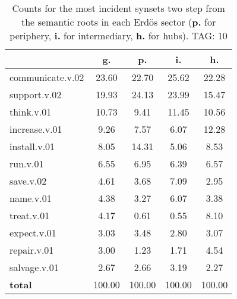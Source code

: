 \begin{table}[h!]
\begin{center}
\begin{tabular}{| l | c | c | c | c |}\hline
 & g. & p. & i. & h. \\\hline
communicate.v.02 & 23.60  & 22.70  & 25.62  & 22.28 \\\hline
support.v.02 & 19.93  & 24.13  & 23.99  & 15.47 \\\hline
think.v.01 & 10.73  & 9.41  & 11.45  & 10.56 \\\hline
increase.v.01 & 9.26  & 7.57  & 6.07  & 12.28 \\\hline
install.v.01 & 8.05  & 14.31  & 5.06  & 8.53 \\\hline
run.v.01 & 6.55  & 6.95  & 6.39  & 6.57 \\\hline
save.v.02 & 4.61  & 3.68  & 7.09  & 2.95 \\\hline
name.v.01 & 4.38  & 3.27  & 6.07  & 3.38 \\\hline
treat.v.01 & 4.17  & 0.61  & 0.55  & 8.10 \\\hline
expect.v.01 & 3.03  & 3.48  & 2.80  & 3.07 \\\hline
repair.v.01 & 3.00  & 1.23  & 1.71  & 4.54 \\\hline
salvage.v.01 & 2.67  & 2.66  & 3.19  & 2.27 \\\hline
{{\bf total}} & 100.00  & 100.00  & 100.00  & 100.00 \\\hline
\end{tabular}
\caption{Counts for the most incident synsets two step from the semantic roots in each Erd\"os sector ({\bf p.} for periphery, {\bf i.} for intermediary, {\bf h.} for hubs). TAG: 10}
\end{center}
\end{table}